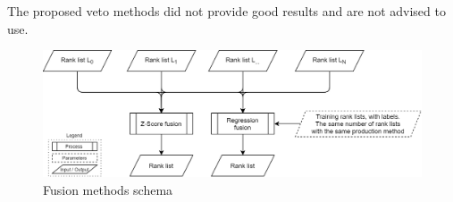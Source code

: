 The proposed veto methods did not provide good results and are not advised to use.

\begin{figure}
  \centering
  \caption{Fusion methods schema}
  \label{fig:schema-fusion}
  \includegraphics[width=1\linewidth]{img/schema-fusion.png}
\end{figure}

\begin{table}
  \caption{Fusion evaluation summary, mean across every datasets}
  \label{tab:fusion_evaluation_summary}
\end{table}

